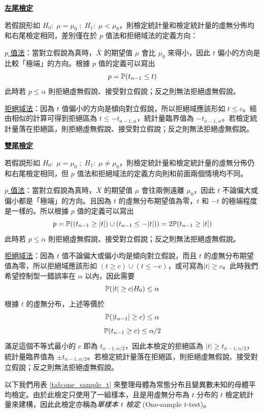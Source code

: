     \noindent\underline{\textbf{左尾檢定}}

    若假說形如 $H_0: \; \mu = \mu_0 \; ; \; H_1: \; \mu < \mu_0$，則檢定統計量和檢定統計量的虛無分佈均和右尾檢定相同，差別僅在於 $p$ 值法和拒絕域法的定義方向：

    \noindent \underline{$p$ 值法}：當對立假說為真時，$\bar{X}$ 的期望值 $\mu$ 會比 $\mu_0$ 來得小，因此 $t$ 偏小的方向是比較「極端」的方向。根據 $p$ 值的定義可以寫出
    \[p = \mathbb{P}(t_{n-1} \le t)\]
    此時若 $p \le \alpha$ 則拒絕虛無假說、接受對立假說；反之則無法拒絕虛無假說。
    
    \noindent \underline{拒絕域法}：因為 $t$ 值偏小的方向是傾向對立假說，所以拒絕域應該形如 $t \le c$。經由相似的計算可得到拒絕區為 $t \le -t_{n-1,\alpha}$，統計量臨界值為 $-t_{n-1,\alpha}$。若檢定統計量落在拒絕區，則拒絕虛無假說、接受對立假說；反之則無法拒絕虛無假說。

    \noindent\underline{\textbf{雙尾檢定}}

    若假說形如 $H_0: \; \mu = \mu_0 \; ; \; H_1: \; \mu \ne \mu_0$，則檢定統計量和檢定統計量的虛無分佈仍和右尾檢定相同，但 $p$ 值法和拒絕域法的定義方向則和前面兩個情境均不同。

    \noindent \underline{$p$ 值法}：當對立假說為真時，$\bar{X}$ 的期望值 $\mu$ 會往兩側遠離 $\mu_0$，因此 $t$ 不論偏大或偏小都是「極端」的方向。且因為 $t$ 的虛無分布期望值為零，$t$ 和 $-t$ 的極端程度是一樣的。所以根據 $p$ 值的定義可以寫出
    \[p = \mathbb{P}((t_{n-1} \ge |t|)\cup(t_{n-1} \le -|t|)) = 2\mathbb{P}(t_{n-1} \ge |t|)\]
    此時若 $p \le \alpha$ 則拒絕虛無假說、接受對立假說；反之則無法拒絕虛無假說。
    
    \noindent \underline{拒絕域法}：因為 $t$ 值不論偏大或偏小均是傾向對立假說，而且 $t$ 的虛無分布期望值為零，所以拒絕域應該形如 $(t \ge c)\cup(t \le -c)$，或可寫為$|t| \ge c$。此時我們希望控制型一錯誤率在 $\alpha$ 以內，因此需要
    \[\mathbb{P}(|t| \ge c|H_0) \le \alpha\]
    根據 $t$ 的虛無分布，上述等價於
    \[\mathbb{P}(|t_{n-1}| \ge c) \le \alpha\]
    \[\mathbb{P}(t_{n-1} \ge c) \le \alpha/2\]
    滿足這個不等式最小的 $c$ 即為 $t_{n-1,\alpha/2}$，因此本檢定的拒絕區為 $|t| \ge t_{n-1,\alpha/2}$，統計量臨界值為 $\pm t_{n-1,\alpha/2}$。若檢定統計量落在拒絕區，則拒絕虛無假說、接受對立假說；反之則無法拒絕虛無假說。
    
    以下我們用表 \ref{tab:one_sample_t} 來整理母體為常態分布且變異數未知的母體平均檢定。由於此檢定只使用了一組樣本，且是用虛無分布為 $t$ 分布的 $t$ 檢定統計量來建構，因此此檢定亦稱為\textit{單樣本 $t$ 檢定} (One-sample $t$-test)。

